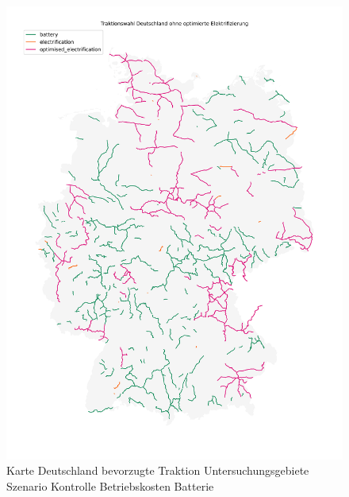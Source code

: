 \begin{center}
	\begin{figure}[p]
	\includegraphics[height=0.8\textheight]{../report_scenarios/s_40/files/deutschland_map}
	\caption{\label{fig_s_40_d_map} Karte Deutschland bevorzugte Traktion Untersuchungsgebiete Szenario Kontrolle Betriebskosten Batterie}
	\end{figure}
\end{center}

